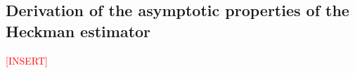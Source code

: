 \subsection{Derivation of the asymptotic properties of the Heckman estimator} \label{derivation_heckman}

\textcolor{red}{[INSERT]}